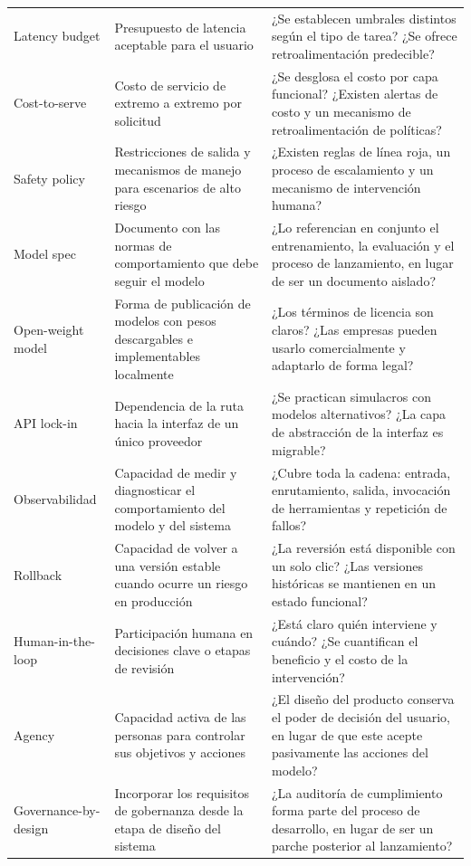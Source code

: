 \documentclass[a4paper]{article}
\begin{document}
\begin{longtable}{p{}p{}p{}}
Latency budget & Presupuesto de latencia aceptable para el usuario & ¿Se establecen umbrales distintos según el tipo de tarea? ¿Se ofrece retroalimentación predecible? \\
Cost-to-serve & Costo de servicio de extremo a extremo por solicitud & ¿Se desglosa el costo por capa funcional? ¿Existen alertas de costo y un mecanismo de retroalimentación de políticas? \\
Safety policy & Restricciones de salida y mecanismos de manejo para escenarios de alto riesgo & ¿Existen reglas de línea roja, un proceso de escalamiento y un mecanismo de intervención humana? \\
Model spec & Documento con las normas de comportamiento que debe seguir el modelo & ¿Lo referencian en conjunto el entrenamiento, la evaluación y el proceso de lanzamiento, en lugar de ser un documento aislado? \\
Open-weight model & Forma de publicación de modelos con pesos descargables e implementables localmente & ¿Los términos de licencia son claros? ¿Las empresas pueden usarlo comercialmente y adaptarlo de forma legal? \\
API lock-in & Dependencia de la ruta hacia la interfaz de un único proveedor & ¿Se practican simulacros con modelos alternativos? ¿La capa de abstracción de la interfaz es migrable? \\
Observabilidad & Capacidad de medir y diagnosticar el comportamiento del modelo y del sistema & ¿Cubre toda la cadena: entrada, enrutamiento, salida, invocación de herramientas y repetición de fallos? \\
Rollback & Capacidad de volver a una versión estable cuando ocurre un riesgo en producción & ¿La reversión está disponible con un solo clic? ¿Las versiones históricas se mantienen en un estado funcional? \\
Human-in-the-loop & Participación humana en decisiones clave o etapas de revisión & ¿Está claro quién interviene y cuándo? ¿Se cuantifican el beneficio y el costo de la intervención? \\
Agency & Capacidad activa de las personas para controlar sus objetivos y acciones & ¿El diseño del producto conserva el poder de decisión del usuario, en lugar de que este acepte pasivamente las acciones del modelo? \\
Governance-by-design & Incorporar los requisitos de gobernanza desde la etapa de diseño del sistema & ¿La auditoría de cumplimiento forma parte del proceso de desarrollo, en lugar de ser un parche posterior al lanzamiento? \\
\bottomrule
\end{longtable}
\end{document}
